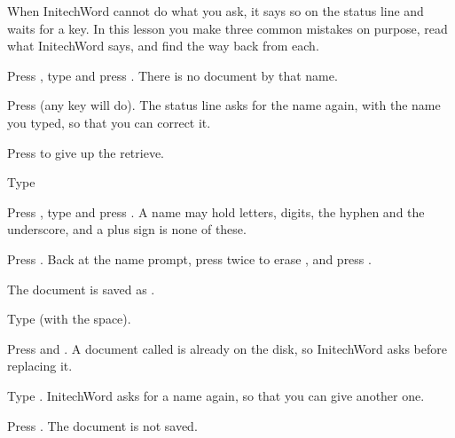 When InitechWord cannot do what you ask, it says so on the status line and
waits for a key.  In this lesson you make three common mistakes on purpose,
read what InitechWord says, and find the way back from each.

\begin{WPSteps}
\item Press , type  and press
.  There is no document by that name.
\end{WPSteps}
\begin{WPSteps}[resume]
\item Press  (any key will do).  The status line asks for the
name again, with the name you typed, so that you can correct it.
\item Press  to give up the retrieve.
\end{WPSteps}

\begin{WPSteps}
\item Type 
\item Press , type  and press
.  A name may hold letters, digits, the hyphen and the
underscore, and a plus sign is none of these.
\end{WPSteps}
\begin{WPSteps}[resume]
\item Press .  Back at the name prompt, press
 twice to erase , and press
.
\end{WPSteps}
The document is saved as .

\begin{WPSteps}
\item Type  (with the space).
\item Press  and .  A document called
 is already on the disk, so InitechWord asks before replacing it.
\end{WPSteps}
\begin{WPSteps}[resume]
\item Type .  InitechWord asks for a name again, so that you can
give another one.
\item Press .  The document is not saved.
\end{WPSteps}

